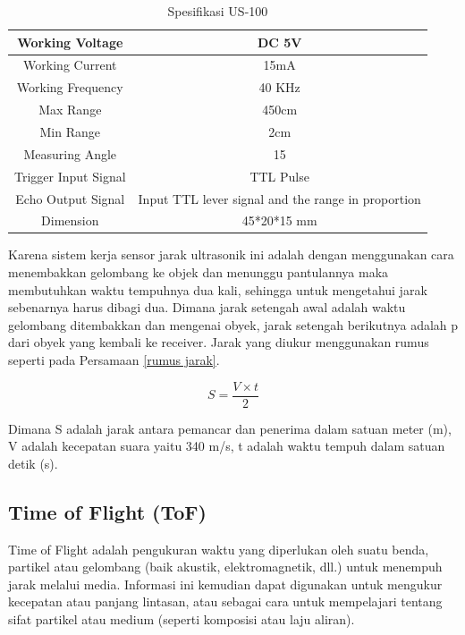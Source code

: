 \begin{table}[h!]\label{tbl:spekUS100}
	\caption{Spesifikasi US-100}
	\centering
	\begin{tabular}{|c|c|}
		\hline
		Working Voltage & DC 5V \\
		\hline
		Working Current & 15mA \\
		\hline
		Working Frequency & 40 KHz \\
		\hline
		Max Range & 450cm \\
		\hline
		Min Range & 2cm \\
		\hline
		Measuring Angle & 15 \\
		\hline
		Trigger Input Signal &  TTL Pulse \\
		\hline
		Echo Output Signal & Input TTL lever signal and the range in proportion \\
		\hline
		Dimension & 45*20*15 mm \\
		\hline
	\end{tabular}
\end{table}

Karena sistem kerja sensor jarak ultrasonik ini adalah dengan menggunakan cara menembakkan gelombang ke objek dan menunggu 
pantulannya maka membutuhkan waktu tempuhnya dua kali, sehingga untuk mengetahui jarak sebenarnya harus dibagi dua. Dimana 
jarak setengah awal adalah waktu gelombang ditembakkan dan mengenai obyek, jarak setengah berikutnya adalah p dari obyek yang kembali ke receiver. 
                                                                                                                                                   Jarak yang diukur menggunakan rumus seperti pada Persamaan \ref*{rumus jarak}.


\begin{equation}\label{rumus jarak}
	 S= \frac{V \times t}{2} 
\end{equation}

Dimana S adalah jarak antara pemancar dan penerima dalam satuan meter (m), V adalah kecepatan suara yaitu 340 m/s, t adalah 
waktu tempuh dalam satuan detik (s).

\subsection{Time of Flight (ToF)}

Time of Flight adalah pengukuran waktu yang diperlukan oleh suatu benda, partikel atau gelombang (baik akustik, elektromagnetik, 
dll.) untuk menempuh jarak melalui media. Informasi ini kemudian dapat digunakan untuk mengukur kecepatan atau panjang lintasan, 
atau sebagai cara untuk mempelajari tentang sifat partikel atau medium (seperti komposisi atau laju aliran). 

